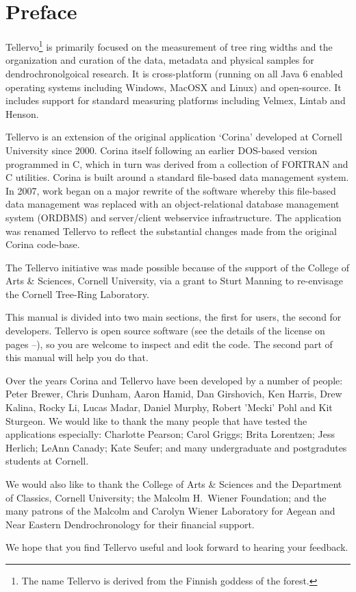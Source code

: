 \section*{Preface}
\thispagestyle{empty} 

Tellervo\footnote{The name Tellervo is derived from the Finnish goddess of the forest.} is primarily focused on the measurement of tree ring widths and the organization and curation of the data, metadata and physical samples for dendrochronolgoical research. It is cross-platform (running on all Java 6 enabled operating systems including Windows, MacOSX and Linux) and open-source. It includes support for standard measuring platforms including Velmex, Lintab and Henson.

Tellervo is an extension of the original application `Corina' developed at Cornell University since 2000.  Corina itself following an earlier DOS-based version programmed in C, which in turn was derived from a collection of FORTRAN and C utilities.  Corina is built around a standard file-based data management system. In 2007, work began on a major rewrite of the software whereby this file-based data management was replaced with an object-relational database management system (ORDBMS) and server/client webservice infrastructure.  The application was renamed Tellervo to reflect the substantial changes made from the original Corina code-base.

The Tellervo initiative was made possible because of the support of the College of Arts \& Sciences, Cornell University, via a grant to Sturt Manning to re-envisage the Cornell Tree-Ring Laboratory.

This manual is divided into two main sections, the first for users, the second for developers.  Tellervo is open source software (see the details of the license on pages \pageref{txt:licenseStart}--\pageref{txt:licenseEnd}), so you are welcome to inspect and edit the code.  The second part of this manual will help you do that.

Over the years Corina and Tellervo have been developed by a number of people: Peter Brewer, Chris Dunham, Aaron Hamid, Dan Girshovich, Ken Harris, Drew Kalina, Rocky Li, Lucas Madar, Daniel Murphy, Robert 'Mecki' Pohl and Kit Sturgeon.  We would like to thank the many people that have tested the applications especially: Charlotte Pearson; Carol Griggs; Brita Lorentzen; Jess Herlich; LeAnn Canady; Kate Seufer; and many undergraduate and postgradutes students at Cornell.  

We would also like to thank the College of Arts \& Sciences and the Department of Classics, Cornell University; the Malcolm H.\ Wiener Foundation; and the many patrons of the Malcolm and Carolyn Wiener Laboratory for Aegean and Near Eastern Dendrochronology for their financial support.  

We hope that you find Tellervo useful and look forward to hearing your feedback.  



